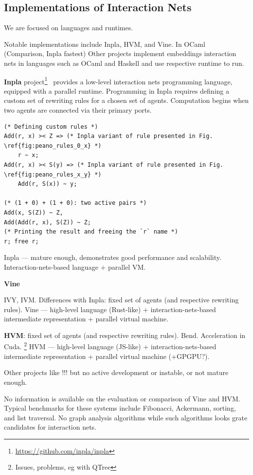 \subsection{Implementations of Interaction Nets}

We are focused on languages and runtimes. 

Notable implementations include Inpla, HVM, and Vine. In OCaml~\cite{Huber_2025} (Comparison, Inpla fastest)
Other projects implement embeddings interaction nets in languages such as OCaml and Haskell and use respective runtime to run.


\textbf{Inpla} project\footnote{\url{https://github.com/inpla/inpla}}~\cite{DBLP:journals/corr/MackieS16} provides a low-level interaction nets programming language, equipped with a parallel runtime.
Programming in Inpla requires defining a custom set of rewriting rules for a chosen set of agents.
Computation begins when two agents are connected via their primary ports.

\begin{listing}[H]
\begin{verbatim}
(* Defining custom rules *)
Add(r, x) >< Z => (* Inpla variant of rule presented in Fig. \ref{fig:peano_rules_0_x} *)
    r ~ x;
Add(r, x) >< S(y) => (* Inpla variant of rule presented in Fig. \ref{fig:peano_rules_x_y} *)
    Add(r, S(x)) ~ y;

(* (1 + 0) + (1 + 0): two active pairs *)
Add(x, S(Z)) ~ Z,
Add(Add(r, x), S(Z)) ~ Z;
(* Printing the result and freeing the `r` name *)
r; free r;
\end{verbatim}
\caption{Peano numerals addition in Inpla}
\label{lst:inpla_peano_add}
\end{listing}

Inpla --- mature enough, demonstrates good performance and scalability. Interaction-nets-based language + parallel VM.

\textbf{Vine}

IVY, IVM. Differences with Inpla: fixed set of agents (and respective rewriting rules).
Vine --- high-level language (Rust-like) + interaction-nets-based intermediate representation + parallel virtual machine.

\textbf{HVM}: fixed set of agents (and respective rewriting rules). Bend.  Acceleration in Cuda. \footnote{Issues, problems, eg with QTree}
HVM --- high-level language (JS-like) + interaction-nets-based intermediate representation + parallel virtual machine (+GPGPU?).


Other projects like !!! but no active development or instable, or not mature enough.

No information is available on the evaluation or comparison of Vine and HVM.
Typical benchmarks for these systems include Fibonacci, Ackermann, sorting, and list traversal. 
No graph analysis algorithms while such algorithms looks grate candidates for interaction nets.
